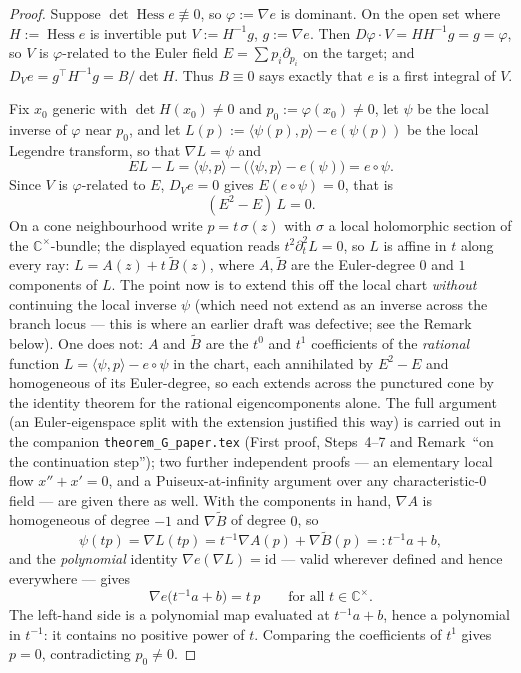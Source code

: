 \documentclass[11pt]{article}
\theoremstyle{plain}
\theoremstyle{definition}
\newcommand{\C}{\mathbb{C}}
\newcommand{\Hess}{\operatorname{Hess}}
\begin{document}
\begin{proof}
Suppose $\det\Hess e\not\equiv0$, so $\varphi:=\nabla e$ is dominant. On the
open set where $H:=\Hess e$ is invertible put $V:=H^{-1}g$, $g:=\nabla e$.
Then $D\varphi\cdot V=HH^{-1}g=g=\varphi$, so $V$ is $\varphi$-related to
the Euler field $E=\sum p_i\partial_{p_i}$ on the target; and
$D_Ve=g^\top H^{-1}g=B/\det H$. Thus $B\equiv0$ says exactly that $e$ is a
first integral of $V$.

Fix $x_0$ generic with $\det H(x_0)\ne0$ and $p_0:=\varphi(x_0)\ne0$, let
$\psi$ be the local inverse of $\varphi$ near $p_0$, and let
$L(p):=\langle\psi(p),p\rangle-e(\psi(p))$ be the local Legendre transform,
so that $\nabla L=\psi$ and
\[
EL-L=\langle\psi,p\rangle-\bigl(\langle\psi,p\rangle-e(\psi)\bigr)=e\circ\psi .
\]
Since $V$ is $\varphi$-related to $E$, $D_Ve=0$ gives $E(e\circ\psi)=0$,
that is
\[
(E^2-E)\,L=0 .
\]
On a cone neighbourhood write $p=t\,\sigma(z)$ with $\sigma$ a local
holomorphic section of the $\C^\times$-bundle; the displayed equation reads
$t^2\partial_t^2L=0$, so $L$ is affine in $t$ along every ray:
$L=A(z)+t\,\widetilde B(z)$, where $A,\widetilde B$ are the Euler-degree $0$
and $1$ components of $L$. The point now is to extend this off the local chart
\emph{without} continuing the local inverse $\psi$ (which need not extend as an
inverse across the branch locus --- this is where an earlier draft was
defective; see the Remark below). One does not: $A$ and $\widetilde B$ are the
$t^0$ and $t^1$ coefficients of the \emph{rational} function
$L=\langle\psi,p\rangle-e\circ\psi$ in the chart, each annihilated by $E^2-E$
and homogeneous of its Euler-degree, so each extends across the punctured cone
by the identity theorem for the rational eigencomponents alone. The full
argument (an Euler-eigenspace split with the extension justified this way) is
carried out in the companion \texttt{theorem\_G\_paper.tex} (First proof,
Steps~4--7 and Remark~``on the continuation step''); two further independent
proofs --- an elementary local flow $x''+x'=0$, and a Puiseux-at-infinity
argument over any characteristic-$0$ field --- are given there as well. With the
components in hand, $\nabla A$ is homogeneous of degree $-1$ and
$\nabla\widetilde B$ of degree $0$, so
\[
\psi(tp)=\nabla L(tp)=t^{-1}\nabla A(p)+\nabla\widetilde B(p)=:t^{-1}a+b ,
\]
and the \emph{polynomial} identity $\nabla e(\nabla L)=\mathrm{id}$ --- valid
wherever defined and hence everywhere --- gives
\[
\nabla e\bigl(t^{-1}a+b\bigr)=t\,p\qquad\text{for all }t\in\C^\times .
\]
The left-hand side is a polynomial map evaluated at $t^{-1}a+b$, hence a
polynomial in $t^{-1}$: it contains no positive power of $t$. Comparing the
coefficients of $t^1$ gives $p=0$, contradicting $p_0\ne0$.
\end{proof}
\end{document}
